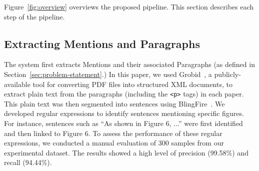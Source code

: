 
Figure~\ref{fig:overview} overviews the proposed pipeline. 
This section describes each step of the pipeline.

\subsection{Extracting Mentions and Paragraphs\label{sec:extract-mention}}
The system first extracts Mentions and their associated Paragraphs (as defined in Section~\ref{sec:problem-statement}.)
In this paper, we used Grobid~\cite{grobid}, a publicly-available tool for converting PDF files into structured XML documents, to extract plain text from the paragraphs (including the \texttt{<p>} tags) in each paper.
This plain text was then segmented into sentences using BlingFire~\cite{blingfire}.
We developed regular expressions to identify sentences mentioning specific figures. 
For instance, sentences such as ``As shown in Figure 6, ...'' were first identified and then linked to Figure 6. 
To assess the performance of these regular expressions, we conducted a manual evaluation of 300 samples from our experimental dataset.
The results showed a high level of precision (99.58\%) and recall (94.44\%).




